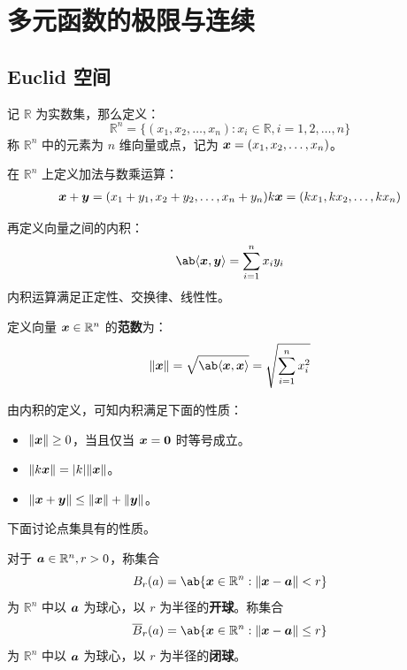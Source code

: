 \section{多元函数的极限与连续}

\subsection{Euclid 空间}

记 $\mathbb{R}$ 为实数集，那么定义：
$$
\mathbb{R}^{n} = \{(x_1, x_2, \dots, x_n): x_i \in \mathbb{R}, i = 1, 2, \dots, n\}
$$
称 $\mathbb{R}^{n}$ 中的元素为 $n$ 维向量或点，记为 $\boldsymbol{x} = (x_1, x_2, \dots, x_n)$。

在 $\mathbb{R}^{n}$ 上定义加法与数乘运算：
$$
\begin{gathered}
    \boldsymbol{x} + \boldsymbol{y} = (x_1 + y_1, x_2 + y_2, \dots, x_n + y_n)
    k \boldsymbol{x} = (k x_1, k x_2, \dots, k x_n)
\end{gathered}
$$

再定义向量之间的内积：
$$
\ab\langle \vect{x}, \vect{y} \rangle = \sum_{i = 1}^{n} x_i y_i
$$
内积运算满足正定性、交换律、线性性。

\begin{definition}
    定义向量 $\boldsymbol{x} \in \mathbb{R}^{n}$ 的\textbf{范数}为：
    $$
    \norm{\vect{x}} = \sqrt{\ab\langle \vect{x}, \vect{x} \rangle} = \sqrt{\sum_{i = 1}^{n} x_i^2}
    $$
\end{definition}

由内积的定义，可知内积满足下面的性质：
\begin{itemize}
    \item $\norm{\boldsymbol{x}} \ge 0$，当且仅当 $\boldsymbol{x} = \boldsymbol{0}$ 时等号成立。
    \item $\norm{k \boldsymbol{x}} = \abs{k} \norm{\boldsymbol{x}}$。
    \item $\norm{\boldsymbol{x} + \boldsymbol{y}} \le \norm{\boldsymbol{x}} + \norm{\boldsymbol{y}}$。
\end{itemize}

下面讨论点集具有的性质。

\begin{definition}
    对于 $\boldsymbol{a} \in \mathbb{R}^{n}, r > 0$，称集合
    $$
    B_r(a) = \ab\{\vect{x} \in \mathbb{R}^{n}: \norm{\vect{x} - \vect{a}} < r\}
    $$
    为 $\mathbb{R}^{n}$ 中以 $\boldsymbol{a}$ 为球心，以 $r$ 为半径的\textbf{开球}。称集合
    $$
    \overline{B}_r(a) = \ab\{\vect{x} \in \mathbb{R}^{n}: \norm{\vect{x} - \vect{a}} \le r\}
    $$
    为 $\mathbb{R}^{n}$ 中以 $\boldsymbol{a}$ 为球心，以 $r$ 为半径的\textbf{闭球}。
\end{definition}

